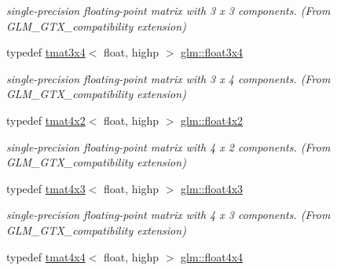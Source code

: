 \begin{DoxyCompactItemize}
\begin{DoxyCompactList}\small\item\em single-\/precision floating-\/point matrix with 3 x 3 components. (From G\+L\+M\+\_\+\+G\+T\+X\+\_\+compatibility extension) \end{DoxyCompactList}\item 
\mbox{\label{group__gtx__compatibility_gadbca4a528b4ef17b78afe91c00420087}} 
typedef \hyperlink{structglm_1_1tmat3x4}{tmat3x4}$<$ float, highp $>$ \hyperlink{group__gtx__compatibility_gadbca4a528b4ef17b78afe91c00420087}{glm\+::float3x4}
\begin{DoxyCompactList}\small\item\em single-\/precision floating-\/point matrix with 3 x 4 components. (From G\+L\+M\+\_\+\+G\+T\+X\+\_\+compatibility extension) \end{DoxyCompactList}\item 
\mbox{\label{group__gtx__compatibility_ga4cb477bf8e9167ab065aa70c7767e329}} 
typedef \hyperlink{structglm_1_1tmat4x2}{tmat4x2}$<$ float, highp $>$ \hyperlink{group__gtx__compatibility_ga4cb477bf8e9167ab065aa70c7767e329}{glm\+::float4x2}
\begin{DoxyCompactList}\small\item\em single-\/precision floating-\/point matrix with 4 x 2 components. (From G\+L\+M\+\_\+\+G\+T\+X\+\_\+compatibility extension) \end{DoxyCompactList}\item 
\mbox{\label{group__gtx__compatibility_gaa0c1ca31e5e064223cc7cfc0344ac787}} 
typedef \hyperlink{structglm_1_1tmat4x3}{tmat4x3}$<$ float, highp $>$ \hyperlink{group__gtx__compatibility_gaa0c1ca31e5e064223cc7cfc0344ac787}{glm\+::float4x3}
\begin{DoxyCompactList}\small\item\em single-\/precision floating-\/point matrix with 4 x 3 components. (From G\+L\+M\+\_\+\+G\+T\+X\+\_\+compatibility extension) \end{DoxyCompactList}\item 
\mbox{\label{group__gtx__compatibility_ga67688a2f2fc6386544d1a47a5d430467}} 
typedef \hyperlink{structglm_1_1tmat4x4}{tmat4x4}$<$ float, highp $>$ \hyperlink{group__gtx__compatibility_ga67688a2f2fc6386544d1a47a5d430467}{glm\+::float4x4}

\end{DoxyCompactItemize}
